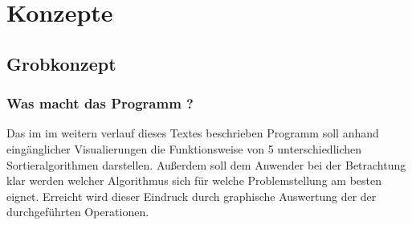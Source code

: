 \chapter{Konzepte}
\label{chap:concepts}
\section{ Grobkonzept }
\subsection{Was macht das Programm ?}

Das im im weitern verlauf dieses Textes beschrieben Programm soll anhand eingänglicher
Visualierungen die Funktionsweise von 5 unterschiedlichen Sortieralgorithmen
darstellen. Außerdem soll dem Anwender bei der Betrachtung klar werden welcher Algorithmus 
sich für welche Problemstellung am besten eignet. Erreicht wird dieser Eindruck durch graphische Auswertung der
der durchgeführten Operationen.
